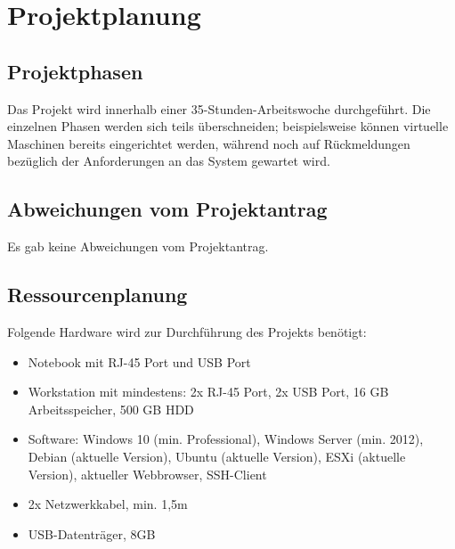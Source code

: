 \section{Projektplanung} 
\label{sec:Projektplanung}

\subsection{Projektphasen}
\label{sec:Projektphasen}
Das Projekt wird innerhalb einer 35-Stunden-Arbeitswoche durchgeführt. Die einzelnen Phasen werden sich teils überschneiden; beispielsweise können virtuelle Maschinen bereits eingerichtet werden, während noch auf Rückmeldungen bezüglich der Anforderungen an das System gewartet wird. 

\subsection{Abweichungen vom Projektantrag}
\label{sec:AbweichungenProjektantrag}
Es gab keine Abweichungen vom Projektantrag.

\subsection{Ressourcenplanung}
\label{sec:Ressourcenplanung}
Folgende Hardware wird zur Durchführung des Projekts benötigt:
\begin{itemize}
  \item Notebook mit RJ-45 Port und USB Port
  \item Workstation mit mindestens: 2x RJ-45 Port, 2x USB Port, 16 GB Arbeitsspeicher, 500 GB HDD
  \item Software: Windows 10 (min. Professional), Windows Server (min. 2012), Debian (aktuelle Version), Ubuntu (aktuelle Version), ESXi (aktuelle Version), aktueller Webbrowser, SSH-Client
  \item 2x Netzwerkkabel, min. 1,5m
  \item USB-Datenträger, 8GB
\end{itemize}